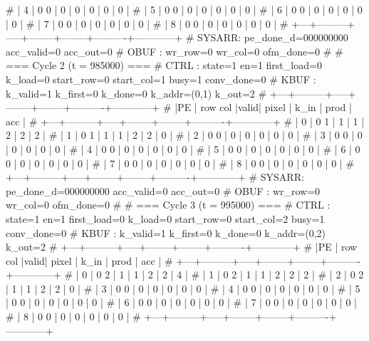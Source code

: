 # | 4 |   0   0 |  0  |      0 |      0 |        0 |          0 |
# | 5 |   0   0 |  0  |      0 |      0 |        0 |          0 |
# | 6 |   0   0 |  0  |      0 |      0 |        0 |          0 |
# | 7 |   0   0 |  0  |      0 |      0 |        0 |          0 |
# | 8 |   0   0 |  0  |      0 |      0 |        0 |          0 |
# +---+---------+-----+--------+--------+----------+------------+
# SYSARR: pe_done_d=000000000 acc_valid=0 acc_out=0
# OBUF : wr_row=0 wr_col=0 ofm_done=0
# 
# === Cycle 2  (t = 985000) ===
# CTRL : state=1 en=1 first_load=0 k_load=0 start_row=0 start_col=1 busy=1 conv_done=0
# KBUF : k_valid=1 k_first=0 k_done=0 k_addr=(0,1) k_out=2
# +---+---------+-----+--------+--------+----------+------------+
# |PE | row col |valid| pixel  |  k_in  |   prod   |    acc     |
# +---+---------+-----+--------+--------+----------+------------+
# | 0 |   0   1 |  1  |      1 |      2 |        2 |          2 |
# | 1 |   0   1 |  1  |      1 |      2 |        2 |          0 |
# | 2 |   0   0 |  0  |      0 |      0 |        0 |          0 |
# | 3 |   0   0 |  0  |      0 |      0 |        0 |          0 |
# | 4 |   0   0 |  0  |      0 |      0 |        0 |          0 |
# | 5 |   0   0 |  0  |      0 |      0 |        0 |          0 |
# | 6 |   0   0 |  0  |      0 |      0 |        0 |          0 |
# | 7 |   0   0 |  0  |      0 |      0 |        0 |          0 |
# | 8 |   0   0 |  0  |      0 |      0 |        0 |          0 |
# +---+---------+-----+--------+--------+----------+------------+
# SYSARR: pe_done_d=000000000 acc_valid=0 acc_out=0
# OBUF : wr_row=0 wr_col=0 ofm_done=0
# 
# === Cycle 3  (t = 995000) ===
# CTRL : state=1 en=1 first_load=0 k_load=0 start_row=0 start_col=2 busy=1 conv_done=0
# KBUF : k_valid=1 k_first=0 k_done=0 k_addr=(0,2) k_out=2
# +---+---------+-----+--------+--------+----------+------------+
# |PE | row col |valid| pixel  |  k_in  |   prod   |    acc     |
# +---+---------+-----+--------+--------+----------+------------+
# | 0 |   0   2 |  1  |      1 |      2 |        2 |          4 |
# | 1 |   0   2 |  1  |      1 |      2 |        2 |          2 |
# | 2 |   0   2 |  1  |      1 |      2 |        2 |          0 |
# | 3 |   0   0 |  0  |      0 |      0 |        0 |          0 |
# | 4 |   0   0 |  0  |      0 |      0 |        0 |          0 |
# | 5 |   0   0 |  0  |      0 |      0 |        0 |          0 |
# | 6 |   0   0 |  0  |      0 |      0 |        0 |          0 |
# | 7 |   0   0 |  0  |      0 |      0 |        0 |          0 |
# | 8 |   0   0 |  0  |      0 |      0 |        0 |          0 |
# +---+---------+-----+--------+--------+----------+------------+
